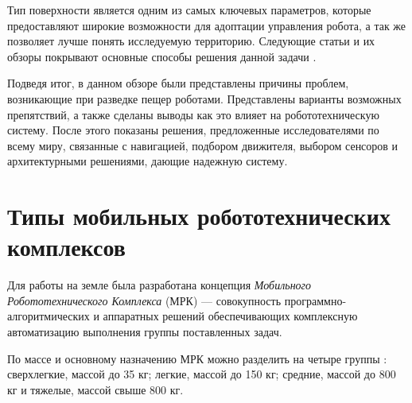 Тип поверхности является одним из самых ключевых параметров, которые предоставляют широкие возможности для адоптации управления робота, а так же позволяет лучше понять исследуемую территорию. Следующие статьи и их обзоры покрывают основные способы решения данной задачи \cite{wuIntegratedGroundReaction2016,wuTactileSensingTerrainBased2020,luo_robotic_2017}.

Подведя итог, в данном обзоре были представлены причины проблем, возникающие при разведке пещер роботами. Представлены варианты возможных препятствий, а также сделаны выводы как это влияет на робототехническую систему. После этого показаны решения, предложенные исследователями по всему миру, связанные с навигацией, подбором движителя, выбором сенсоров и архитектурными решениями, дающие надежную систему. 

\section{Типы мобильных робототехнических комплексов}
Для работы на земле была разработана концепция \textit{Мобильного Робототехнического Комплекса} (МРК) ---  совокупность программно-алгоритмических и аппаратных решений обеспечивающих комплексную автоматизацию выполнения группы поставленных задач.

По массе и основному назначению МРК можно разделить на четыре группы : сверхлегкие, массой до 35 кг; легкие, массой до 150 кг; средние, массой до 800 кг и тяжелые, массой свыше 800 кг.

